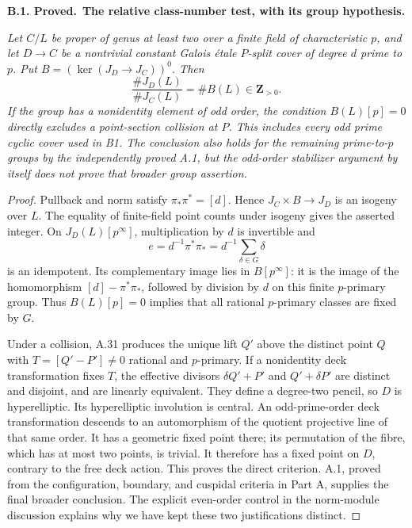 \documentclass[11pt,a4paper]{article}
\newenvironment{claim}[3]{\par\medskip\noindent\hypertarget{#1}{\textbf{#1. #2.}}\ \textbf{#3.}\par\nopagebreak\smallskip\begingroup\itshape}{\endgroup\par\smallskip}
\begin{document}
\begin{claim}{B.1}{Proved}{The relative class-number test, with its group hypothesis}
Let $C/L$ be proper of genus at least two over a finite field of
characteristic $p$, and let $D\to C$ be a nontrivial constant Galois
\'etale $P$-split cover of degree $d$ prime to $p$. Put
$B=(\ker(J_D\to J_C))^0$. Then
\[
 \frac{\#J_D(L)}{\#J_C(L)}=\#B(L)\in\mathbf Z_{>0}.
\]
If the group has a nonidentity element of odd order, the condition
$B(L)[p]=0$ directly excludes a point-section collision at $P$.
This includes every odd prime cyclic cover used in B1.
The conclusion also holds for the remaining prime-to-$p$ groups
by the independently proved A.1, but the odd-order stabilizer
argument by itself does not prove that broader group assertion.
\end{claim}
\begin{proof}
Pullback and norm satisfy $\pi_*\pi^*=[d]$. Hence
$J_C\times B\to J_D$ is an isogeny over $L$. The equality of
finite-field point counts under isogeny gives the asserted integer.
On $J_D(L)[p^\infty]$, multiplication by $d$ is invertible and
\[
 e=d^{-1}\pi^*\pi_*=d^{-1}\sum_{\delta\in G}\delta
\]
is an idempotent. Its complementary image lies in $B[p^\infty]$:
it is the image of the homomorphism $[d]-\pi^*\pi_*$, followed
by division by $d$ on this finite $p$-primary group. Thus
$B(L)[p]=0$ implies that all rational $p$-primary classes are
fixed by $G$.

Under a collision, A.31 produces the unique lift $Q'$ above the
distinct point $Q$ with $T=[Q'-P']\ne0$ rational and $p$-primary.
If a nonidentity deck transformation fixes $T$, the effective
divisors $\delta Q'+P'$ and $Q'+\delta P'$ are distinct and
disjoint, and are linearly equivalent. They define a degree-two
pencil, so $D$ is hyperelliptic. Its hyperelliptic involution is
central. An odd-prime-order deck transformation descends to an
automorphism of the quotient projective line of that same order.
It has a geometric fixed point there; its permutation of the fibre,
which has at most two points, is trivial. It therefore has a fixed
point on $D$, contrary to the free deck action. This proves the
direct criterion. A.1, proved from the configuration, boundary,
and cuspidal criteria in Part A, supplies the final broader conclusion.
The explicit even-order control in the norm-module discussion
explains why we have kept these two justifications distinct.
\end{proof}
\end{document}
